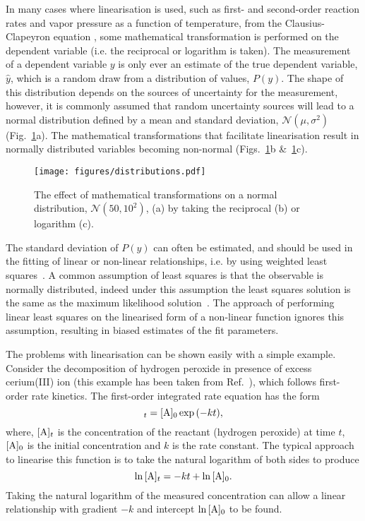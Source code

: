 \documentclass[reprint,superscriptaddress,nobibnotes,amsmath,amssymb]{revtex4-2}
\begin{document}
In many cases where linearisation is used, such as first- and second-order reaction rates and vapor pressure as a function of temperature, from the Clausius-Clapeyron equation \cite{perrin_linear_2017,harper_data_2017}, some mathematical transformation is performed on the dependent variable (i.e. the reciprocal or logarithm is taken). 
The measurement of a dependent variable $y$ is only ever an estimate of the true dependent variable, $\hat{y}$, which is a random draw from a distribution of values, $P(y)$. 
The shape of this distribution depends on the sources of uncertainty for the measurement, however, it is commonly assumed that random uncertainty sources will lead to a normal distribution defined by a mean and standard deviation, $\mathcal{N}(\mu, \sigma^2)$~\cite{monk_math_2010} (Fig.~\ref{fig:distributions}a).
The mathematical transformations that facilitate linearisation result in normally distributed variables becoming non-normal (Figs.~\ref{fig:distributions}b \&~\ref{fig:distributions}c).
%
\begin{figure}
  \texttt{[image: figures/distributions.pdf]}
  \caption{
    The effect of mathematical transformations on a normal distribution, $\mathcal{N}(50, 10^2)$, (a) by taking the reciprocal (b) or logarithm (c).
    }
  \label{fig:distributions}
\end{figure}
%

The standard deviation of $P(y)$ can often be estimated, and should be used in the fitting of linear or non-linear relationships, i.e. by using weighted least squares~\cite{harris_nonlinear_1998, perrin_linear_2017}.
A common assumption of least squares is that the observable is normally distributed, indeed under this assumption the least squares solution is the same as the maximum likelihood solution~\cite{hayashi_econometrics_2001}.
The approach of performing linear least squares on the linearised form of a non-linear function ignores this assumption, resulting in biased estimates of the fit parameters. 

The problems with linearisation can be shown easily with a simple example. 
Consider the decomposition of hydrogen peroxide  in presence of excess cerium(III) ion (this example has been taken from Ref.~\cite{monk_math_2010}), which follows first-order rate kinetics.
The first-order integrated rate equation has the form 
%
\begin{equation}
    [\ce{A}]_t = [\ce{A}]_0\exp{(-kt)},
\end{equation}
%
where, $[\ce{A}]_t$ is the concentration of the reactant  (hydrogen peroxide) at time $t$, $[\ce{A}]_0$ is the initial concentration and $k$ is the rate constant. 
The typical approach to linearise this function is to take the natural logarithm of both sides to produce
%
\begin{equation}
    \ln{[\ce{A}]_t} = -kt + \ln{[\ce{A}]_0}.
\end{equation}
%
Taking the natural logarithm of the measured concentration can allow a linear relationship with gradient $-k$ and intercept $\ln{[\ce{A}]_0}$ to be found. 
\end{document}

